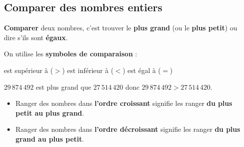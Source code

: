 \begin{pageCours} 
\section{Comparer des nombres entiers}

\begin{Def}
\textbf{Comparer} deux nombres, c'est trouver le \textbf{plus grand} (ou le \textbf{plus petit}) ou dire s'ils sont \textbf{égaux}.

On utilise les \textbf{symboles de comparaison} :
\begin{center}
est supérieur à ($>$) \hspace{1cm} est inférieur à ($<$) \hspace{1cm} est égal à ($=$)
\end{center}
\end{Def}

\begin{Ex}
$29\,874\,492$ est plus grand que $27\,514\,420$ donc $29\,874\,492>27\,514\,420$.
\end{Ex}



\begin{Def}
\begin{itemize}
\item Ranger des nombres dans \textbf{l'ordre croissant} signifie les ranger \textbf{du plus petit au plus grand}.
\item Ranger des nombres dans \textbf{l'ordre décroissant} signifie les ranger \textbf{du plus grand au plus petit}.
\end{itemize}
\end{Def}




\end{pageCours}
